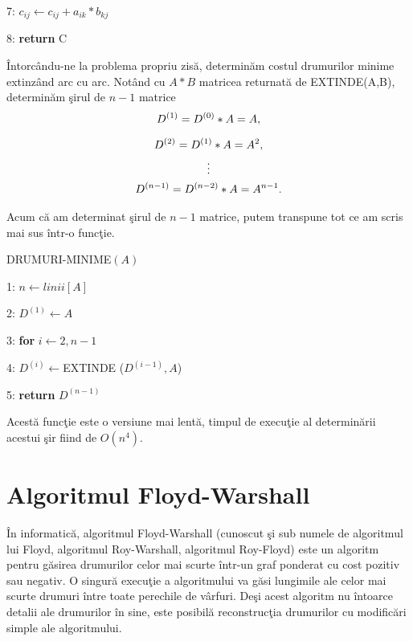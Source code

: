 \documentclass[11pt,a4paper]{report}
\begin{document}
     7:\hspace{1.8cm} $c_{ij}\leftarrow c_{ij}+a_{ik}*b_{kj}$
     
     8: \textbf{return } C
     \vspace{0.3cm}
     
     \^ Intorc\^ andu-ne la problema propriu zis\u a, determin\u am costul drumurilor minime  extinz\^ and arc cu arc. Not\^ and cu $A*B$ matricea returnat\u a de EXTINDE(A,B), determin\u am \c sirul de $n-1$ matrice
	\begin{gather*}
         D^{(1)}=D^{(0)}*A=A,\medskip\\
   		 D^{(2)}=D^{(1)}*A=A^{2},\\
   		 \vdots \\
   		 D^{(n-1)}=D^{(n-2)}*A=A^{n-1}.
	\end{gather*}
	
	Acum c\u a am determinat \c sirul de $n-1$ matrice, putem transpune tot ce am scris mai sus \^ intr-o func\c tie.
	
	          \vspace{0.3cm}
	DRUMURI-MINIME$(A)$
	
	\vspace{0.1cm}
	1: $n\leftarrow linii[A]$
	
	2: $D^{(1)}\leftarrow A $
	
	3: \textbf{for} $i\leftarrow 2,n-1$ 
	
	4: \hspace{0.6cm} $D^{(i)}\leftarrow $EXTINDE ($D^{(i-1)},A$)
	
	5: \textbf{return} $D^{(n-1)}$
	\vspace{0.3cm}
    
    Acest\u a func\c tie este o versiune mai lent\u a, timpul de execu\c tie al determin\u arii acestui \c sir fiind de $O(n^4)$.
    
    \section{Algoritmul Floyd-Warshall}
    
    \^ In informatic\u a, algoritmul Floyd-Warshall (cunoscut \c si sub numele de algoritmul lui Floyd, algoritmul Roy-Warshall, algoritmul Roy-Floyd) este un algoritm pentru g\u asirea drumurilor celor mai scurte \^ intr-un graf ponderat cu cost pozitiv sau negativ. O singur\u a execu\c tie a algoritmului va g\u asi lungimile ale celor mai scurte drumuri \^ intre toate perechile de v\^ arfuri. De\c si acest algoritm nu \^ intoarce detalii ale drumurilor \^ in sine, este posibil\u a reconstruc\c tia drumurilor cu modific\u ari simple ale algoritmului.
    
\end{document}
